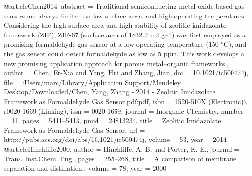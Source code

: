 @article{Chen2014,
abstract = {Traditional semiconducting metal oxide-based gas sensors are always limited on low surface areas and high operating temperatures. Considering the high surface area and high stability of zeolitic imidazolate framework (ZIF), ZIF-67 (surface area of 1832.2 m2 g–1) was first employed as a promising formaldehyde gas sensor at a low operating temperature (150 °C), and the gas sensor could detect formaldehyde as low as 5 ppm. This work develops a new promising application approach for porous metal–organic frameworks.},
author = {Chen, Er-Xia and Yang, Hui and Zhang, Jian},
doi = {10.1021/ic500474j},
file = {:Users/marc/Library/Application Support/Mendeley Desktop/Downloaded/Chen, Yang, Zhang - 2014 - Zeolitic Imidazolate Framework as Formaldehyde Gas Sensor.pdf:pdf},
isbn = {1520-510X (Electronic)$\backslash$r0020-1669 (Linking)},
issn = {0020-1669},
journal = {Inorganic Chemistry},
number = {11},
pages = {5411--5413},
pmid = {24813234},
title = {{Zeolitic Imidazolate Framework as Formaldehyde Gas Sensor}},
url = {http://pubs.acs.org/doi/abs/10.1021/ic500474j},
volume = {53},
year = {2014}
}
@article{Hinchliffe2000,
author = {Hinchliffe, A. B. and Porter, K. E.},
journal = {Trans. Inst.Chem. Eng.},
pages = {255--268},
title = {{A comparison of membrane separation and distillation.}},
volume = {78},
year = {2000}
}
